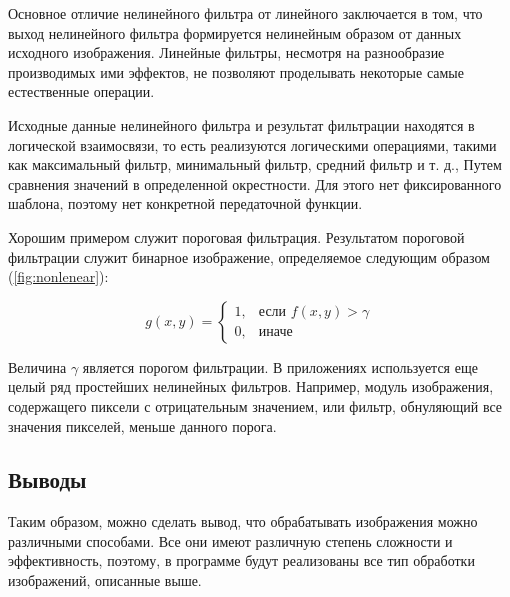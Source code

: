 Основное отличие нелинейного фильтра от линейного заключается в том, что выход нелинейного фильтра формируется нелинейным образом от данных исходного изображения. Линейные фильтры, несмотря на разнообразие производимых ими эффектов, не позволяют проделывать некоторые самые естественные операции. 

Исходные данные нелинейного фильтра и результат фильтрации находятся в логической взаимосвязи, то есть реализуются логическими операциями, такими как максимальный фильтр, минимальный фильтр, средний фильтр и т. д., Путем сравнения значений в определенной окрестности. Для этого нет фиксированного шаблона, поэтому нет конкретной передаточной функции.

Хорошим примером служит пороговая фильтрация. Результатом пороговой фильтрации служит бинарное изображение, определяемое следующим образом (\ref{fig:nonlenear}):

\begin{equation}
	\label{fig:nonlenear}
	g(x, y) = 
	\begin{cases}
		1, &\text{если $f(x, y) > \gamma$}\\
		0, &\text{иначе}
	\end{cases}
\end{equation}

Величина \(\gamma\) является порогом фильтрации. В приложениях используется еще целый ряд простейших нелинейных фильтров. Например, модуль изображения, содержащего пиксели с отрицательным значением, или фильтр, обнуляющий все значения пикселей, меньше данного порога.

\subsection*{Выводы}

Таким образом, можно сделать вывод, что обрабатывать изображения можно различными способами. Все они имеют различную степень сложности и эффективность, поэтому, в программе будут реализованы все тип обработки изображений, описанные выше.

\pagebreak